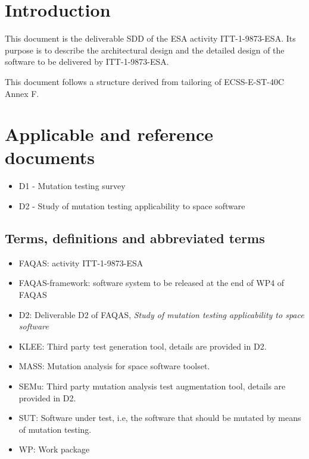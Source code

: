 
\chapter{Introduction}

This document is the deliverable SDD of the ESA activity ITT-1-9873-ESA. Its purpose is to describe the architectural design and the detailed design of the software to be delivered by ITT-1-9873-ESA. 

This document follows a structure derived from tailoring of ECSS-E-ST-40C Annex F.



\chapter{Applicable and reference documents}

\begin{itemize}
\item{D1 - Mutation testing survey}
\item{D2 - Study of mutation testing applicability to space software}
\end{itemize}

\section{Terms, definitions and abbreviated terms}

\begin{itemize}
\item{FAQAS}: activity ITT-1-9873-ESA
\item{FAQAS-framework}: software system to be released at the end of WP4 of FAQAS
\item{D2}: Deliverable D2 of FAQAS, \emph{Study of mutation testing applicability to space software}
\item{KLEE}: Third party test generation tool, details are provided in D2.
\item{MASS}: Mutation analysis for space software toolset. 
\item{SEMu}: Third party mutation analysis test augmentation tool, details are provided in D2.
\item{SUT}: Software under test, i.e, the software that should be mutated by means of mutation testing.
\item{WP}: Work package
\end{itemize}


